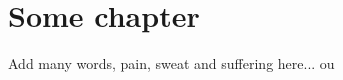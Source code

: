 
\chapter{Some chapter}
\label{chap:some}

Add many words, pain, sweat and suffering here... \acrfull{ou} \cite{fuggetta2014}
